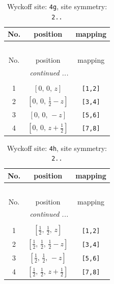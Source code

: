 \documentclass[fleqn,8pt]{jsarticle}
\begin{document}
\renewcommand{\arraystretch}{1.2}
\begin{longtable}{ccc}
\caption{Wyckoff site: {\tt 4g}, site symmetry: {\tt 2..}}
 \\
 \hline \hline
No. & position & mapping \\ \hline \endfirsthead

\multicolumn{2}{l}{\tablename\ \thetable{}} \\
 \hline \hline
No. & position & mapping \\ \hline \endhead

 \hline \hline
\multicolumn{2}{r}{\footnotesize\it continued ...} \\ \endfoot

 \hline \hline
\multicolumn{2}{r}{} \\ \endlastfoot

1 & $\left[ 0,\, 0,\, z \right]$ & {\tt [1,2]} \\ \hline
2 & $\left[ 0,\, 0,\, \frac{1}{2} - z \right]$ & {\tt [3,4]} \\ \hline
3 & $\left[ 0,\, 0,\, - z \right]$ & {\tt [5,6]} \\ \hline
4 & $\left[ 0,\, 0,\, z + \frac{1}{2} \right]$ & {\tt [7,8]} \\
\end{longtable}
\renewcommand{\arraystretch}{1.2}
\begin{longtable}{ccc}
\caption{Wyckoff site: {\tt 4h}, site symmetry: {\tt 2..}}
 \\
 \hline \hline
No. & position & mapping \\ \hline \endfirsthead

\multicolumn{2}{l}{\tablename\ \thetable{}} \\
 \hline \hline
No. & position & mapping \\ \hline \endhead

 \hline \hline
\multicolumn{2}{r}{\footnotesize\it continued ...} \\ \endfoot

 \hline \hline
\multicolumn{2}{r}{} \\ \endlastfoot

1 & $\left[ \frac{1}{2},\, \frac{1}{2},\, z \right]$ & {\tt [1,2]} \\ \hline
2 & $\left[ \frac{1}{2},\, \frac{1}{2},\, \frac{1}{2} - z \right]$ & {\tt [3,4]} \\ \hline
3 & $\left[ \frac{1}{2},\, \frac{1}{2},\, - z \right]$ & {\tt [5,6]} \\ \hline
4 & $\left[ \frac{1}{2},\, \frac{1}{2},\, z + \frac{1}{2} \right]$ & {\tt [7,8]} \\
\end{longtable}
\end{document}
